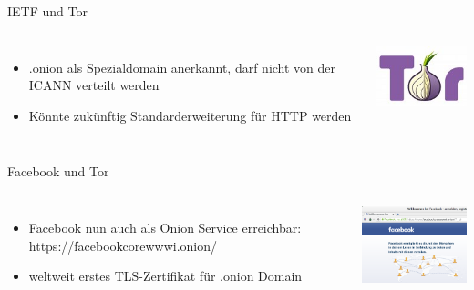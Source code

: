 \documentclass[12pt, xcolor={svgnames,table}]{beamer}
\begin{document}
\begin{frame}{IETF und Tor}
  \begin{columns}
    \column{5.5cm}
    \footnotesize

    \begin{itemize}
      \item .onion als Spezialdomain anerkannt, darf nicht von der ICANN verteilt werden
      \item Könnte zukünftig Standarderweiterung für HTTP werden
    \end{itemize}

    \column{5cm}

    \begin{center}
      \includegraphics[width=3.5cm]{img/tor-logo.jpg}
    \par\end{center}
  \end{columns}
\end{frame}

\begin{frame}{Facebook und Tor}
  \begin{columns}
    \column{5.5cm}
    \footnotesize

    \begin{itemize}
      \item Facebook nun auch als Onion Service erreichbar: https://facebookcorewwwi.onion/
      \item weltweit erstes TLS-Zertifikat für .onion Domain
    \end{itemize}

    \column{5cm}

    \begin{center}
      \includegraphics[width=4.5cm]{img/tor-facebook.png}
    \par\end{center}
  \end{columns}
\end{frame}
\end{document}

